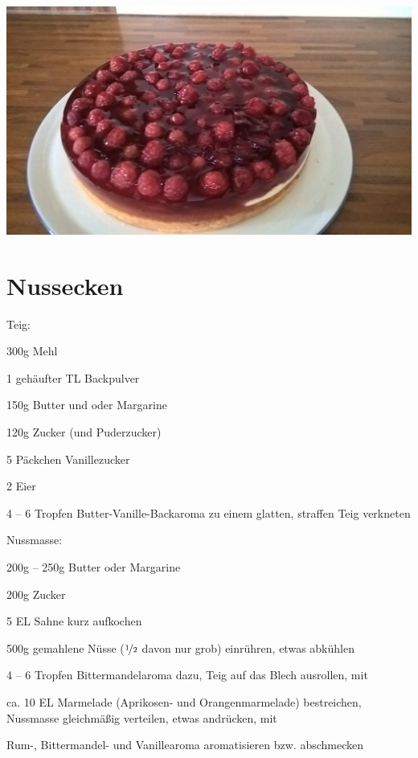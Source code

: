 \documentclass[a4,12pt,footinclude=true,oneside,headinclude=true]{scrartcl} %
\author[myemail@cookby.com]{Jokobus}
\begin{document}
	\begin{titlepage}
		\maketitle
		\includegraphics[width=\textwidth]{cake.jpg}
		\thispagestyle{empty}
	\end{titlepage}
	
	{\setcounter{page}{2}
		\normalfont
		\hypertarget{gototableofcontent}{}
		\tableofcontents
		\pagebreak
	}
	
\section{Nussecken}



Teig: 
\begin{ingredients}
	\item 300g Mehl
	\item 1 gehäufter TL Backpulver 
	\item 150g Butter und oder Margarine
	\item 120g Zucker (und Puderzucker)
	\item 5 Päckchen Vanillezucker
	\item 2 Eier 
	\item 4 -- 6 Tropfen Butter-Vanille-Backaroma
	\subitem zu einem glatten, straffen Teig verkneten
\end{ingredients}
	Nussmasse: 

\begin{ingredients}
	\item 200g -- 250g Butter oder Margarine
	\item 200g Zucker
	\item 5 EL Sahne 
		\subitem kurz aufkochen
	\item 500g gemahlene Nüsse ($\nicefrac{1}{2}$ davon nur grob)
		\subitem einrühren, etwas abkühlen
	\item 4 -- 6 Tropfen Bittermandelaroma
		\subitem dazu, Teig auf das Blech ausrollen, mit
	\item ca. 10 EL Marmelade (Aprikosen- und Orangenmarmelade)
		\subitem bestreichen, Nussmasse gleichmäßig verteilen, etwas andrücken, mit
	\item Rum-, Bittermandel- und Vanillearoma
		\subitem aromatisieren bzw. abschmecken
\end{ingredients} 
\end{document}
